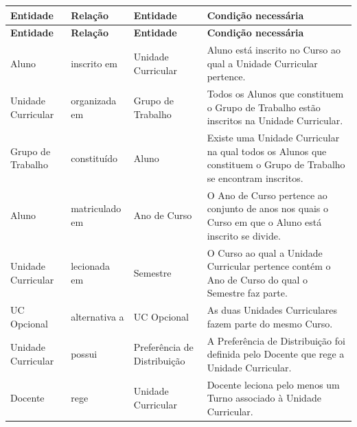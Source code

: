 \documentclass[12pt, a4paper]{article}
\begin{document}
\begin{longtable}{|>{\centering}m{2.5cm}
                  |>{\centering}m{2.5cm}
                  |>{\centering}m{2.5cm}
                  |m{8cm}|}
    \hline
    \textbf{Entidade} & \textbf{Relação} & \textbf{Entidade} & \textbf{Condição necessária} \\
    \hline
    \endfirsthead

    \hline
    \textbf{Entidade} & \textbf{Relação} & \textbf{Entidade} & \textbf{Condição necessária} \\
    \hline
    \endhead

    Aluno              &
    inscrito em        &
    Unidade Curricular &
    Aluno está inscrito no Curso ao qual a Unidade Curricular pertence. \\

    \hline
    Unidade Curricular &
    organizada em      &
    Grupo de Trabalho  &
    Todos os Alunos que constituem o Grupo de Trabalho estão inscritos na Unidade Curricular. \\

    \hline
    Grupo de Trabalho &
    constituído       &
    Aluno             &
    Existe uma Unidade Curricular na qual todos os Alunos que constituem o Grupo de Trabalho se
    encontram inscritos. \\

    \hline
    Aluno          &
    matriculado em &
    Ano de Curso   &
    O Ano de Curso pertence ao conjunto de anos nos quais o Curso em que o Aluno está inscrito se
    divide. \\

    \hline
    Unidade Curricular &
    lecionada em       &
    Semestre           &
    O Curso ao qual a Unidade Curricular pertence contém o Ano de Curso do qual o Semestre faz
    parte. \\

    \hline
    UC Opcional   &
    alternativa a &
    UC Opcional   &
    As duas Unidades Curriculares fazem parte do mesmo Curso. \\

    \hline
    Unidade Curricular          &
    possui                      &
    Preferência de Distribuição &
    A Preferência de Distribuição foi definida pelo Docente que rege a Unidade Curricular. \\

    \hline
    Docente            &
    rege               &
    Unidade Curricular &
    Docente leciona pelo menos um Turno associado à Unidade Curricular. \\


\end{longtable}
\end{document}
